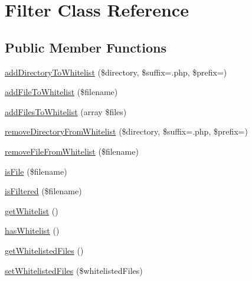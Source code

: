 \hypertarget{class_sebastian_bergmann_1_1_code_coverage_1_1_filter}{}\section{Filter Class Reference}
\label{class_sebastian_bergmann_1_1_code_coverage_1_1_filter}
\subsection*{Public Member Functions}
\begin{DoxyCompactItemize}
\item 
\mbox{\hyperlink{class_sebastian_bergmann_1_1_code_coverage_1_1_filter_a2bcc1c479fa74e9a5b03ad497dcb5525}{add\+Directory\+To\+Whitelist}} (\$directory, \$suffix=\textquotesingle{}.php\textquotesingle{}, \$prefix=\textquotesingle{}\textquotesingle{})
\item 
\mbox{\hyperlink{class_sebastian_bergmann_1_1_code_coverage_1_1_filter_a72c5200d3fb8588e4cce9f9b340be179}{add\+File\+To\+Whitelist}} (\$filename)
\item 
\mbox{\hyperlink{class_sebastian_bergmann_1_1_code_coverage_1_1_filter_a988d1f57218a3308ba7f19f7f3fd5aa1}{add\+Files\+To\+Whitelist}} (array \$files)
\item 
\mbox{\hyperlink{class_sebastian_bergmann_1_1_code_coverage_1_1_filter_a8fcc5366aa6c6772275d64b81c6f842a}{remove\+Directory\+From\+Whitelist}} (\$directory, \$suffix=\textquotesingle{}.php\textquotesingle{}, \$prefix=\textquotesingle{}\textquotesingle{})
\item 
\mbox{\hyperlink{class_sebastian_bergmann_1_1_code_coverage_1_1_filter_aef8d8fda014043856367e415855bfe9d}{remove\+File\+From\+Whitelist}} (\$filename)
\item 
\mbox{\hyperlink{class_sebastian_bergmann_1_1_code_coverage_1_1_filter_a5f37d2d0bb86f5c48409e83520c9123a}{is\+File}} (\$filename)
\item 
\mbox{\hyperlink{class_sebastian_bergmann_1_1_code_coverage_1_1_filter_a9563dfa4aaa1e9be39ac4894ada00238}{is\+Filtered}} (\$filename)
\item 
\mbox{\hyperlink{class_sebastian_bergmann_1_1_code_coverage_1_1_filter_a7331adeb0481414743674d2f6166565e}{get\+Whitelist}} ()
\item 
\mbox{\hyperlink{class_sebastian_bergmann_1_1_code_coverage_1_1_filter_aca12b2d1bf5489a718869acee933d726}{has\+Whitelist}} ()
\item 
\mbox{\hyperlink{class_sebastian_bergmann_1_1_code_coverage_1_1_filter_a3ae946d06d5bcdbf648bd640f77bb0e1}{get\+Whitelisted\+Files}} ()
\item 
\mbox{\hyperlink{class_sebastian_bergmann_1_1_code_coverage_1_1_filter_a3c5b94ecdcfc786a5a593c66b0151bba}{set\+Whitelisted\+Files}} (\$whitelisted\+Files)
\end{DoxyCompactItemize}


